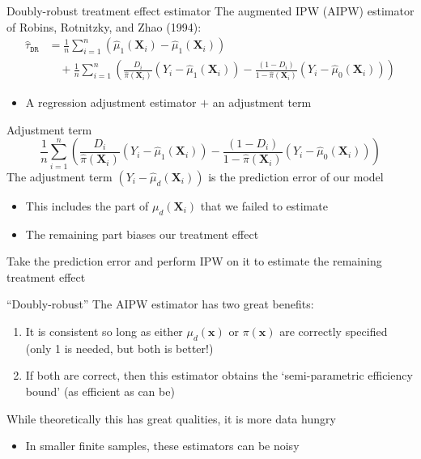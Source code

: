 \documentclass[aspectratio=169,t,11pt,table]{beamer}
\begin{document}
\begin{frame}{Doubly-robust treatment effect estimator}
  The augmented IPW (AIPW) estimator of Robins, Rotnitzky, and Zhao (1994):
  \begin{align*}
    \hat{\tau}_{\texttt{DR}} &= \frac{1}{n} \sum_{i=1}^n \left( \hat{\mu}_{1}(\bm{X}_i) - \hat{\mu}_{1}(\bm{X}_i) \right) \\
    &\quad+ \frac{1}{n} \sum_{i=1}^n \left( 
       \frac{D_i}{\hat{\pi}(\bm{X}_i)} (Y_i - \hat{\mu}_{1}(\bm{X}_i)) -
       \frac{(1 - D_i)}{1 - \hat{\pi}(\bm{X}_i)} (Y_i - \hat{\mu}_{0}(\bm{X}_i)) 
    \right) 
  \end{align*}
  \begin{itemize}
    \item A regression adjustment estimator $+$ an adjustment term
  \end{itemize}
\end{frame}

\begin{frame}{Adjustment term}
  \vspace*{-\bigskipamount}
  $$
    \frac{1}{n} \sum_{i=1}^n \left( 
      \frac{D_i}{\hat{\pi}(\bm{X}_i)} (Y_i - \hat{\mu}_{1}(\bm{X}_i)) -
      \frac{(1 - D_i)}{1 - \hat{\pi}(\bm{X}_i)} (Y_i - \hat{\mu}_{0}(\bm{X}_i)) 
    \right) 
  $$
  The adjustment term $(Y_i - \hat{\mu}_d(\bm{X}_i))$ is the prediction error of our model
  \begin{itemize}
    \item This includes the part of $\mu_d(\bm{X}_i)$ that we failed to estimate
    \item The remaining part biases our treatment effect
  \end{itemize}
  
  Take the prediction error and perform IPW on it to estimate the remaining treatment effect
\end{frame}

\begin{frame}{``Doubly-robust''}
  The AIPW estimator has two great benefits:
  \begin{enumerate}
    \item It is consistent so long as either $\mu_d(\bm{x})$ or $\pi(\bm{x})$ are correctly specified (only 1 is needed, but both is better!)
    
    \pause
    \item If both are correct, then this estimator obtains the `semi-parametric efficiency bound' (as efficient as can be)
  \end{enumerate}

  \pause
  \bigskip
  While theoretically this has great qualities, it is more data hungry
  \begin{itemize}
    \item In smaller finite samples, these estimators can be noisy
  \end{itemize}
\end{frame}
\end{document}
